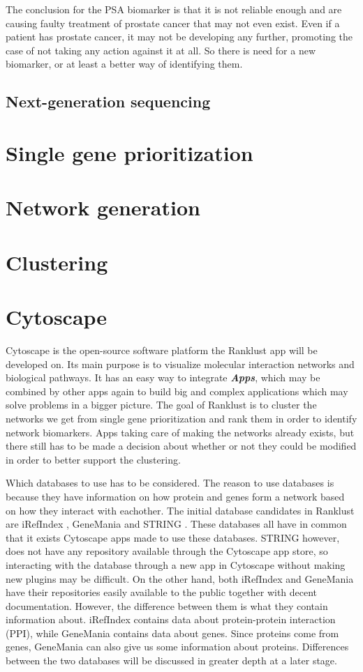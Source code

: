 \documentclass[UKenglish,11pt,a4paper]{article}
\begin{document}
The conclusion for the PSA biomarker is that it is not reliable enough and are causing faulty treatment of prostate
cancer that may not even exist. Even if a patient has prostate cancer, it may not be developing any further, promoting
the case of not taking any action against it at all. So there is need for a new biomarker, or at least a better way of
identifying them.

\subsection{Next-generation sequencing}
\section{Single gene prioritization}
\section{Network generation}
\section{Clustering}
\section{Cytoscape}
Cytoscape is the open-source software platform the Ranklust app will be developed on. Its main purpose is to visualize
molecular interaction networks and biological pathways. It has an easy way to integrate \textbf{\textit{Apps}}, which may
be combined by other apps again to build big and complex applications which may solve problems in a bigger picture. The
goal of Ranklust is to cluster the networks we get from single gene prioritization and rank them in order to identify
network biomarkers. Apps taking care of making the networks already exists, but there still has to be made a decision
about whether or not they could be modified in order to better support the clustering.

Which databases to use has to be considered. The reason to use databases is because they have information on how protein 
and genes form a network based on how they interact with eachother. The initial database candidates in Ranklust are
iRefIndex \cite{iri}, GeneMania \cite{gm} and STRING \cite{str}. These databases all have in common that it exists
Cytoscape apps made to use these databases. STRING however, does not have any repository available through the Cytoscape
app store, so interacting with the database through a new app in Cytoscape without making new plugins may be difficult.
On the other hand, both iRefIndex and GeneMania have their repositories easily available to the public together with
decent documentation. However, the difference between them is what they contain information about. iRefIndex contains
data about protein-protein interaction (PPI), while GeneMania contains data about genes.
Since proteins come from genes, GeneMania can also give us some information about proteins. Differences between the
two databases will be discussed in greater depth at a later stage.
\end{document}
